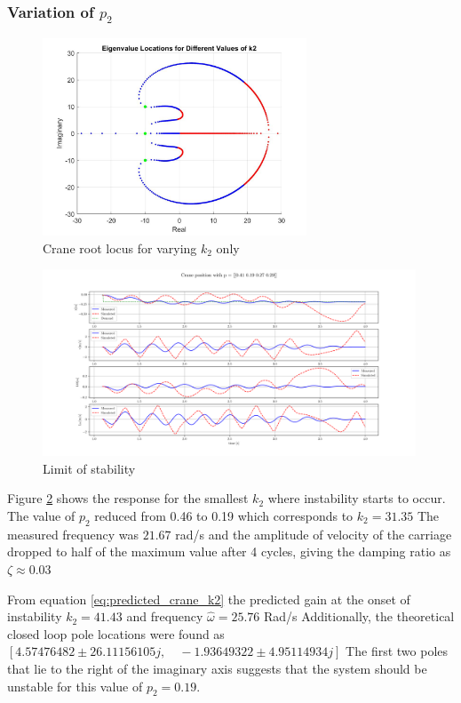 \documentclass{article}
\begin{document}
\subsubsection{Variation of $p_2$}

\begin{figure}[H]
  \centering
  \includegraphics[width=0.7\textwidth]{figures/3.5roots.jpg}
  \caption{Crane root locus for varying $k_2$ only}
  \label{fig:roots3.5}
\end{figure}

\begin{figure}[H]
  \centering
  \includegraphics[width=0.99\textwidth]{figures/3.5.png}
  \caption{Limit of stability}
  \label{fig:exp3.5}
\end{figure}

Figure \ref{fig:exp3.5} shows the response for the smallest $k_2$ where instability starts to occur.
The value of $p_2$ reduced from 0.46 to 0.19 which corresponds to $k_2 = 31.35$
The measured frequency was $21.67$ rad/s and the amplitude of velocity of the carriage dropped to half of the maximum value after 4 cycles, giving the damping ratio as $\zeta \approx 0.03$

From equation \ref{eq:predicted_crane_k2} the predicted gain at the onset of instability $k_2 = 41.43$ and frequency $\hat{\omega} = 25.76$ Rad/s
Additionally, the theoretical closed loop pole locations were found as \\ 
$[ 4.57476482 \pm 26.11156105j , \quad -1.93649322 \pm 4.95114934j]$
The first two poles that lie to the right of the imaginary axis suggests that the system should be unstable for this value of $p_2 = 0.19$.
\end{document}
